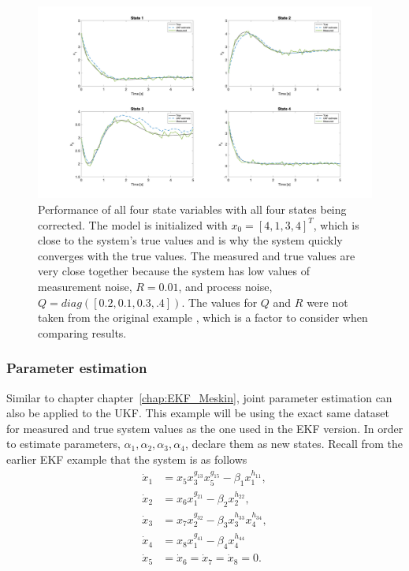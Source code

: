\begin{figure}[ht]
    \centering
    \includegraphics[scale = 0.24]{UKF_states.png}
    \caption{Performance of all four state variables with all four states being corrected. The model is initialized with $x_0 = [4, 1, 3, 4]^T$, which is close to the system's true values and is why the system quickly converges with the true values. The measured and true values are very close together because the system has low values of measurement noise, $R=0.01$, and process noise, $Q=diag([0.2, 0.1, 0.3, .4])$. The values for $Q$ and $R$ were not taken from the original example \cite{article5}, which is a factor to consider when comparing results.}
    \label{fig:UKF_states}
\end{figure}




\clearpage


\subsubsection{Parameter estimation}

Similar to chapter chapter~\ref{chap:EKF_Meskin}, joint parameter estimation can also be applied to the UKF. This example will be using the exact same dataset for measured and true system values as the one used in the EKF version. In order to estimate parameters, $\alpha_1,\alpha_2, \alpha_3, \alpha_4$, declare them as new states. Recall from the earlier EKF example that the system is as follows
\begin{align*}
\dot x_1 &= x_5  x_3^{g_{13}} x_5^{g_{15}} - \beta_1 x_1^{h_{11}} , \\
\dot x_2 &= x_6  x_1^{g_{21}} - \beta_2 x_2^{h_{22}}, \\
\dot x_3 &= x_7  x_2^{g_{32}} - \beta_3 x_3^{h_{33}} x_4^{h_{34}}, \\
\dot x_4 &= x_8   x_1^{g_{41}} - \beta_4 x_4^{h_{44}} \\
\dot x_5 &= \dot x_6= \dot x_7 = \dot x_8 = 0.
\end{align*}

